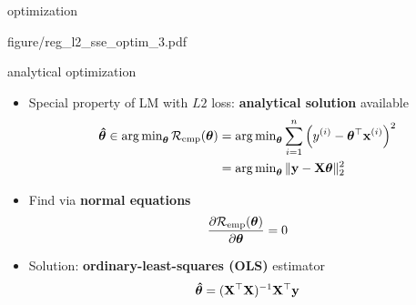 \documentclass[11pt,compress,t,notes=noshow, xcolor=table]{beamer}
\begin{document}
\begin{frame}{optimization}
\begin{minipage}[c]{0.45\textwidth}
{{    figure/reg_l2_sse_optim_3.pdf}}
\end{minipage}


\end{frame}


\begin{vbframe}{analytical optimization}

\begin{itemize}
    \item Special property of LM with $L2$ loss: \textbf{analytical solution}
    available
    \begin{align*}
        \bm{\hat\theta} \in 
        \operatorname{arg\,min}_{\bm{\theta}} \mathcal{R}_{\text{emp}}(\bm{\theta}) &=
        \operatorname{arg\,min}_{\bm{\theta}} \sum\limits_{i=1}^n \left(y^{(i)} - \bm{\theta}^\top \mathbf{x}^{(i)} \right)^2  \\
        &= \operatorname{arg\,min}_{\bm{\theta}} \| \mathbf{y} - \mathbf{X} \bm{\theta} \|^2_2
    \end{align*}
    \normalsize
    \item Find via \textbf{normal equations}
    $$\frac{\partial{\mathcal{R}_{\text{emp}}(\bm{\theta})}}{\partial \bm{\theta}} = 0$$
    \item Solution: \textbf{ordinary-least-squares (OLS)} estimator
    $$\bm{\hat\theta} = (\mathbf{X}^\top \mathbf{X})^{-1} \mathbf{X}^\top \mathbf{y}$$
\end{itemize}

\end{vbframe}
\end{document}
